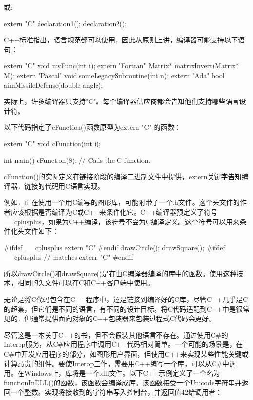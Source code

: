 或:

\begin{cpp}
extern "C" {
    declaration1();
    declaration2();
}
\end{cpp}

C++标准指出，语言规范都可以使用，因此从原则上讲，编译器可能支持以下语句：

\begin{cpp}
extern "C" void myFunc(int i);
extern "Fortran" Matrix* matrixInvert(Matrix* M);
extern "Pascal" void someLegacySubroutine(int n);
extern "Ada" bool aimMissileDefense(double angle);
\end{cpp}

实际上，许多编译器只支持"C"。每个编译器供应商都会告知他们支持哪些语言设计符。

以下代码指定了cFunction()函数原型为extern "C" 的函数：

\begin{cpp}
extern "C" {
    void cFunction(int i);
}

int main()
{
    cFunction(8); // Calls the C function.
}
\end{cpp}

cFunction()的实际定义在链接阶段的编译二进制文件中提供，extern关键字告知编译器，链接的代码用C语言实现。

例如，正在使用一个用C编写的图形库，可能附带了一个.h文件。这个头文件的作者应该根据是否编译为C或C++来条件化它。C++编译器预定义了符号\_\_cplusplus，如果为C++编译，该符号不会为C编译定义。这个符号可以用来条件化头文件如下：

\begin{cpp}
#ifdef __cplusplus
    extern "C" {
#endif
        drawCircle();
        drawSquare();
#ifdef __cplusplus
    } // matches extern "C"
#endif
\end{cpp}

所以drawCircle()和drawSquare()是在由C编译器编译的库中的函数。使用这种技术，相同的头文件可以在C和C++客户端中使用。

无论是将C代码包含在C++程序中，还是链接到编译好的C库，尽管C++几乎是C的超集，但它们是不同的语言，有不同的设计目标。将C代码适配到C++中是很常见的，但通常提供面向对象的C++包装器来包装过程式C代码会更好。


尽管这是一本关于C++的书，但不会假装其他语言不存在。通过使用C\#的Interop服务，从C\#应用程序中调用C++代码相对简单。一个可能的场景是，在C\#中开发应用程序的部分，如图形用户界面，但使用C++来实现某些性能关键或计算昂贵的组件。要使Interop工作，需要用C++编写一个库，可以从C\#中调用。在Windows上，库将是一个.dll文件。以下C++示例定义了一个名为functionInDLL()的函数，该函数会编译成库。该函数接受一个Unicode字符串并返回一个整数。实现将接收到的字符串写入控制台，并返回值42给调用者：

